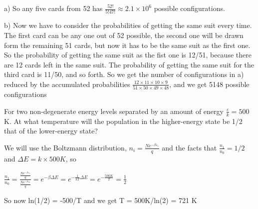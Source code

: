 \documentclass[addpoints,12pt]{exam}
\begin{document}
\begin{questions}
\begin{solution}
a) So any five cards from 52 has \(\frac{52!}{5!47!} \approx 2.1\times10^6\) possible configurations.

b) Now we have to consider the probabilities of getting the same suit every time. The first card can be any one out of 52 possible, the second one will be drawn form the remaining 51 cards, but now it has to be the same suit as the first one. So the probability of getting the same suit as the fist one is 12/51, because there are 12 cards left in the same suit. The probability of getting the same suit for the third card is 11/50, and so forth. So we get the number of configurations in a) reduced by the accumulated probabilities \(\frac{12\times11\times10\times9}{51\times50\times49\times48}\), and we get 5148 possible configurations
\end{solution}

\question For two non-degenerate energy levels separated by an amount of energy \(\frac{\varepsilon}{k}=500\) K. At what temperature will the population in the higher-energy state be 1/2 that of the lower-energy state?

\begin{solution} We will use the Boltzmann distribution, \(n_i = \frac{Ne^{-\beta\varepsilon_i}}{q}\) and the facts that \(\frac{n_1}{n_0} = 1/2\) and \(\Delta E = k\times500K\), so

\(\frac{n_1}{n_0} = \frac{\frac{Ne^{-\beta\varepsilon_1}}{q}}{\frac{Ne^{-\beta\varepsilon_0}}{q}} = e^{-\beta\Delta E} = e^{-\frac{1}{kT}\Delta E} = e^{-\frac{500K}{T}} = \frac{1}{2}\)

So now ln(1/2) = -500/T and we get T = 500K/ln(2) = 721 K
\end{solution}

\end{questions}
\end{document}
